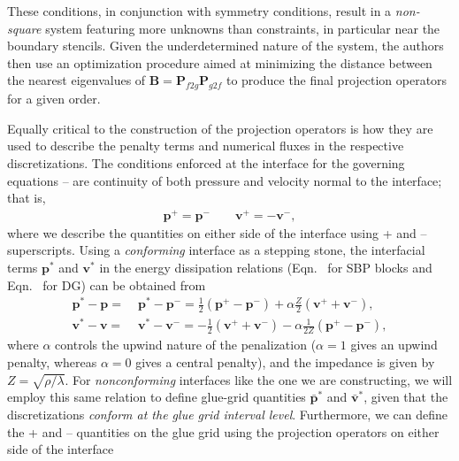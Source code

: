 These conditions, in conjunction with symmetry conditions, result in a \emph{non-square}
system featuring more unknowns than constraints, in particular near the boundary stencils.
Given the underdetermined nature of the system, the authors then use an optimization
procedure aimed at minimizing the distance between the nearest eigenvalues of $\pmb{B} =
\pmb{P}_{f2g}\pmb{P}_{g2f}$ to produce the final projection operators for a given order.

Equally critical to the construction of the projection operators is how they are used to describe the
penalty terms and numerical fluxes in the respective discretizations. The conditions enforced
at the interface for the governing equations -- are continuity
of both pressure and velocity normal to the interface; that is,
\begin{align}
  \pmb{p}^{+} = \pmb{p}^{-}
  \qquad
  \pmb{v}^{+} = -\pmb{v}^{-},
\end{align}
where we describe the quantities on either side of the interface using + and -- superscripts.
Using a \emph{conforming} interface as a stepping stone, the interfacial terms $\pmb{p}^{*}$
and $\pmb{v}^{*}$ in the energy dissipation relations (Eqn.~ for SBP blocks
and Eqn.~ for DG) can be obtained from
\begin{align}
  \label{eqn:pen:con:v}
  \pmb{p}^* - \pmb{p} =\;&
  \pmb{p}^{*} - \pmb{p}^{-} =
  \frac{1}{2}\left(\pmb{p}^{+}-\pmb{p}^{-}\right)
  +\alpha\frac{Z}{2}\left( \pmb{v}^{+}+\pmb{v}^{-} \right),\\
  \label{eqn:pen:con:p}
  \pmb{v}^* - \pmb{v} =\;&
  \pmb{v}^* - \pmb{v}^{-} =
  -\frac{1}{2}\left(\pmb{v}^{+}+\pmb{v}^{-}\right)
  -\alpha\frac{1}{2Z} \left(\pmb{p}^{+}-\pmb{p}^{-}\right),
\end{align}
where $\alpha$ controls the upwind nature of the penalization ($\alpha = 1$ gives
an upwind penalty, whereas $\alpha = 0$ gives a central penalty), and the impedance
is given by $Z = \sqrt{\rho/\lambda}$. For \emph{nonconforming} interfaces like the
one we are constructing, we will employ this same relation to define glue-grid quantities
$\pmb{\bar{p}}^*$ and $\pmb{\bar{v}}^*$, given that the discretizations \emph{conform at the
glue grid interval level}. Furthermore, we can define the + and -- quantities on the glue grid using
the projection operators on either side of the interface
